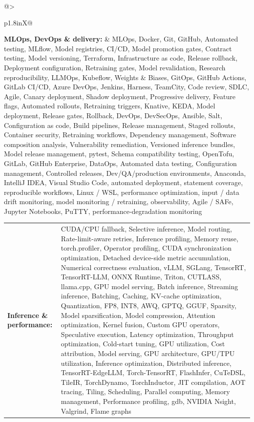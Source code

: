\documentclass[letterpaper,11pt]{article}
\begin{document}
\begin{tabularx}{\linewidth}{@{}>{\raggedright\arraybackslash}p{1.8in}X@{}}
\textbf{MLOps, DevOps \& delivery:} & \footnotesize{MLOps, Docker, Git, GitHub, Automated testing, MLflow, Model registries, CI/CD, Model promotion gates, Contract testing, Model versioning, Terraform, Infrastructure as code, Release rollback, Deployment configuration, Retraining gates, Model revalidation, Research reproducibility, LLMOps, Kubeflow, Weights \& Biases, GitOps, GitHub Actions, GitLab CI/CD, Azure DevOps, Jenkins, Harness, TeamCity, Code review, SDLC, Agile, Canary deployment, Shadow deployment, Progressive delivery, Feature flags, Automated rollouts, Retraining triggers, Knative, KEDA, Model deployment, Release gates, Rollback, DevOps, DevSecOps, Ansible, Salt, Configuration as code, Build pipelines, Release management, Staged rollouts, Container security, Retraining workflows, Dependency management, Software composition analysis, Vulnerability remediation, Versioned inference bundles, Model release management, pytest, Schema compatibility testing, OpenTofu, GitLab, GitHub Enterprise, DataOps, Automated data testing, Configuration management, Controlled releases, Dev/QA/production environments, Anaconda, IntelliJ IDEA, Visual Studio Code, automated deployment, statement coverage, reproducible workflows, Linux / WSL, performance optimization, input / data drift monitoring, model monitoring / retraining, observability, Agile / SAFe, Jupyter Notebooks, PuTTY, performance-degradation monitoring}\\
\end{tabularx}
\par\vspace{2pt}
\begin{tabularx}{\linewidth}{@{}>{\raggedright\arraybackslash}p{1.8in}X@{}}
\textbf{Inference \& performance:} & \footnotesize{CUDA/CPU fallback, Selective inference, Model routing, Rate-limit-aware retries, Inference profiling, Memory reuse, torch.profiler, Operator profiling, CUDA synchronization optimization, Detached device-side metric accumulation, Numerical correctness evaluation, vLLM, SGLang, TensorRT, TensorRT-LLM, ONNX Runtime, Triton, CUTLASS, llama.cpp, GPU model serving, Batch inference, Streaming inference, Batching, Caching, KV-cache optimization, Quantization, FP8, INT8, AWQ, GPTQ, GGUF, Sparsity, Model sparsification, Model compression, Attention optimization, Kernel fusion, Custom GPU operators, Speculative execution, Latency optimization, Throughput optimization, Cold-start tuning, GPU utilization, Cost attribution, Model serving, GPU architecture, GPU/TPU utilization, Inference optimization, Distributed inference, TensorRT-EdgeLLM, Torch-TensorRT, FlashInfer, CuTeDSL, TileIR, TorchDynamo, TorchInductor, JIT compilation, AOT tracing, Tiling, Scheduling, Parallel computing, Memory management, Performance profiling, gdb, NVIDIA Nsight, Valgrind, Flame graphs}\\
\end{tabularx}
\end{document}
